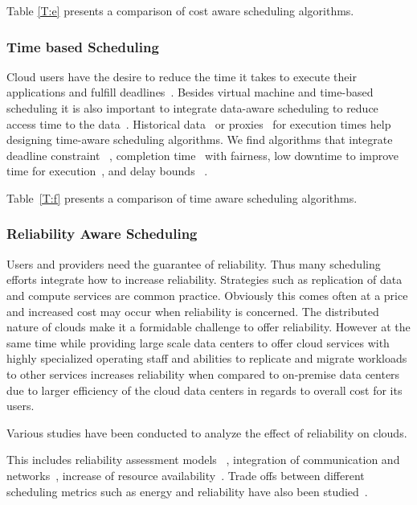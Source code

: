 \documentclass[final,5p,times,twocolumn]{elsarticle}
\begin{document}
Table \ref{T:e} presents a comparison of cost aware scheduling
algorithms.



\subsubsection{Time based Scheduling}\label{sec:time}


Cloud users have the desire to reduce the time it takes to execute
their applications and fulfill
deadlines~\cite{arabnejad2017scheduling}.  Besides virtual machine and
time-based scheduling it is also important to integrate data-aware
scheduling to reduce access time to the data~\cite{vandenbosshe2013}.
Historical data~\cite{thomas2015credit} or
proxies~\cite{erdil2013autonomic} for execution times help designing
time-aware scheduling algorithms.  We find algorithms that integrate
deadline constraint ~\cite{li2016energy}, completion
time~\cite{xu2011job} with fairness, low downtime to improve time for
execution~\cite{frincu2014scheduling}, and delay bounds
~\cite{yuan2017time}.

Table~\ref{T:f} presents a comparison of time aware
scheduling algorithms.



\subsubsection{Reliability Aware Scheduling}\label{sec:reliability}



Users and providers need the guarantee of reliability. Thus many
scheduling efforts integrate how to increase reliability. Strategies
such as replication of data and compute services are common
practice. Obviously this comes often at a price and increased cost may
occur when reliability is concerned. The distributed nature of clouds
make it a formidable challenge to offer reliability. However at the
same time while providing large scale data centers to offer cloud
services with highly specialized operating staff and abilities to
replicate and migrate workloads to other services increases
reliability when compared to on-premise data centers due to larger
efficiency of the cloud data centers in regards to overall cost for
its users.

Various studies have been conducted to analyze the effect of reliability on clouds.

This includes reliability assessment models
~\cite{malik2012reliability}, integration of communication and
networks~\cite{jing2015reliability}, increase of resource
availability~\cite{latiff2016fault}. Trade offs between different
scheduling metrics such as energy and reliability have also been
studied~\cite{tang2016energy}.
\end{document}
